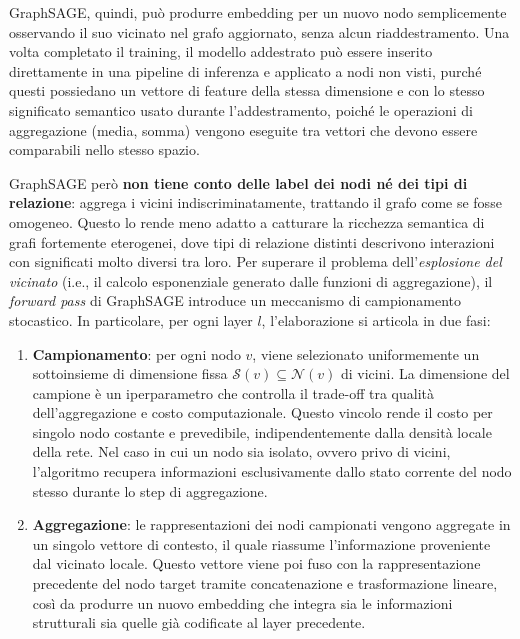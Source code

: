 GraphSAGE, quindi, può produrre embedding per un nuovo nodo semplicemente osservando il suo vicinato nel grafo aggiornato, senza alcun riaddestramento. Una volta completato il training, il modello addestrato può essere inserito direttamente in una pipeline di inferenza e applicato a nodi non visti, purché questi possiedano un vettore di feature della stessa dimensione e con lo stesso significato semantico usato durante l'addestramento, poiché le operazioni di aggregazione (media, somma) vengono eseguite tra vettori che devono essere comparabili nello stesso spazio.

GraphSAGE però \textbf{non tiene conto delle label dei nodi né dei tipi di relazione}: aggrega i vicini indiscriminatamente, trattando il grafo come se fosse omogeneo. Questo lo rende meno adatto a catturare la ricchezza semantica di grafi fortemente eterogenei, dove tipi di relazione distinti descrivono interazioni con significati molto diversi tra loro. Per superare il problema dell'\textit{esplosione del vicinato} (i.e., il calcolo esponenziale generato dalle funzioni di aggregazione), il \textit{forward pass} di GraphSAGE introduce un meccanismo di campionamento stocastico. In particolare, per ogni layer $l$, l'elaborazione si articola in due fasi:

\begin{enumerate} 

    \item \textbf{Campionamento}: per ogni nodo $v$, viene selezionato uniformemente un sottoinsieme di dimensione fissa $\mathcal{S}(v) \subseteq \mathcal{N}(v)$ di vicini. La dimensione del campione è un iperparametro che controlla il trade-off tra qualità dell'aggregazione e costo computazionale. Questo vincolo rende il costo per singolo nodo costante e prevedibile, indipendentemente dalla densità locale della rete. Nel caso in cui un nodo sia isolato, ovvero privo di vicini, l'algoritmo recupera informazioni esclusivamente dallo stato corrente del nodo stesso durante lo step di aggregazione.
    \item \textbf{Aggregazione}: le rappresentazioni dei nodi campionati vengono aggregate in un singolo vettore di contesto, il quale riassume l'informazione proveniente dal vicinato locale. Questo vettore viene poi fuso con la rappresentazione precedente del nodo target tramite concatenazione e trasformazione lineare, così da produrre un nuovo embedding che integra sia le informazioni strutturali sia quelle già codificate al layer precedente. \end{enumerate}

